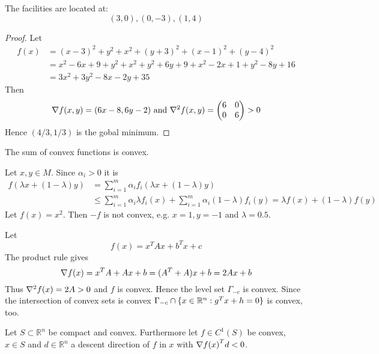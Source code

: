 \begin{exercise}
    The facilities are located at:
    \[
        (3, 0), (0, -3), (1, 4)
    \]
\end{exercise}

\begin{proof}
    Let
    \[
        \begin{split}
            f(x)    & = {(x - 3)}^2 + y^2 + x^2 + {(y + 3)}^2 + {(x - 1)}^2 + {(y - 4)}^2 \\
            & = x^2 - 6x + 9 + y^2 + x^2 + y^2 + 6y + 9 + x^2 - 2x + 1 + y^2 -8y + 16 \\
            & = 3x^2 + 3y^2 - 8x - 2y + 35
        \end{split}
    \]
    Then
    \[
        \nabla f(x, y) = (6x - 8, 6y - 2) \text{ and } \nabla^2 f(x, y) =
        \begin{pmatrix}
            6 & 0 \\
            0 & 6 \\
        \end{pmatrix} > 0
    \]
    Hence \( (4 / 3, 1 / 3) \) is the gobal minimum.
\end{proof}
\bigskip


The sum of convex functions is convex.

\proof{}
Let \( x, y \in M \). Since \( \alpha_i  > 0 \) it is
\[
    \begin{split}
        f(\lambda x + (1 - \lambda) y)
        & = \sum_{i=1}^m \alpha_i f_i(\lambda x + (1 - \lambda) y) \\
        & \le \sum_{i=1}^m \alpha_i \lambda f_i(x) + \sum_{i=1}^m \alpha_i (1 - \lambda) f_i(y)
        =  \lambda f(x) + (1 - \lambda) f(y)
    \end{split}
\]
Let \( f(x) = x^2 \). Then \( -f \) is not convex, e.g. \( x = 1, y = -1 \) and \( \lambda = 0.5 \).
\bigskip


Let
\[
    f(x) = x^{T}Ax + b^{T}x + c
\]
\proof{}
The product rule gives
\[
    \nabla {f(x)} = x^{T}A + Ax + b = (A^{T} + A)x + b = 2Ax + b
\]
Thus \( \nabla^2 {f(x)} = 2A > 0 \) and \( f \) is convex. Hence the level set \( \Gamma_{-c} \) is convex.
Since the intersection of convex sets is convex \( \Gamma_{-c} \cap \{ x \in \mathbb{R}^n: g^{T}x + h = 0 \} \)
is convex, too.
\bigskip


Let \( S \subset \mathbb{R}^n \) be compact and convex. Furthermore let \( f \in C^1(S) \) be convex,
\( x \in S \) and \( d \in \mathbb{R}^n \) a descent direction of \( f \) in \( x \)
with \( \nabla {f(x)}^T d < 0 \).

